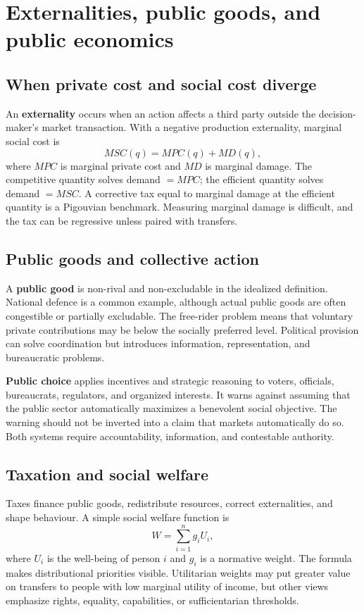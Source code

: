 \documentclass[11pt,oneside,openany]{book}
\newcommand{\term}[1]{\textbf{#1}\index{#1}}
\begin{document}
\chapter{Externalities, public goods, and public economics}
\label{ch:public}

\section{When private cost and social cost diverge}

An \term{externality} occurs when an action affects a third party outside the decision-maker's market transaction. With a negative production externality, marginal social cost is
\[
  MSC(q)=MPC(q)+MD(q),
\]
where $MPC$ is marginal private cost and $MD$ is marginal damage. The competitive quantity solves demand $=MPC$; the efficient quantity solves demand $=MSC$. A corrective tax equal to marginal damage at the efficient quantity is a Pigouvian benchmark. Measuring marginal damage is difficult, and the tax can be regressive unless paired with transfers.

\section{Public goods and collective action}

A \term{public good} is non-rival and non-excludable in the idealized definition. National defence is a common example, although actual public goods are often congestible or partially excludable. The free-rider problem means that voluntary private contributions may be below the socially preferred level. Political provision can solve coordination but introduces information, representation, and bureaucratic problems.

\term{Public choice} applies incentives and strategic reasoning to voters, officials, bureaucrats, regulators, and organized interests. It warns against assuming that the public sector automatically maximizes a benevolent social objective. The warning should not be inverted into a claim that markets automatically do so. Both systems require accountability, information, and contestable authority.

\section{Taxation and social welfare}

Taxes finance public goods, redistribute resources, correct externalities, and shape behaviour. A simple social welfare function is
\[
  W=\sum_{i=1}^{n}g_i U_i,
\]
where $U_i$ is the well-being of person $i$ and $g_i$ is a normative weight. The formula makes distributional priorities visible. Utilitarian weights may put greater value on transfers to people with low marginal utility of income, but other views emphasize rights, equality, capabilities, or sufficientarian thresholds.
\end{document}
